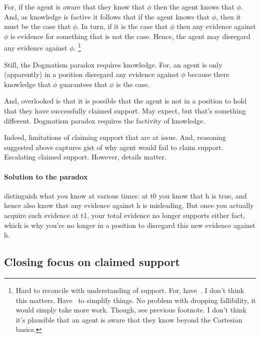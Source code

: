 \begin{note}
  For, if the agent is aware that they know that \(\phi\) then the agent knows that \(\phi\).
  And, as knowledge is factive it follows that if the agent knows that \(\phi\), then it must be the case that \(\phi\).
  In turn, if it is the case that \(\phi\) then any evidence against \(\phi\) is evidence for something that is not the case.
  Hence, the agent may disregard any evidence against \(\phi\).\nolinebreak
  \footnote{
    Hard to reconcile with understanding of support.
    For, have~\nfcs{}.
    I don't think this matters.
    Have~\nfcs{} to simplify things.
    No problem with dropping fallibility, it would simply take more work.
    Though, see previous footnote.
    I don't think it's plausible that an agent is aware that they know beyond the Cartesian basics.
  }

  Still, the Dogmatism paradox requires knowledge.
  For, an agent is only (apparently) in a position disregard any evidence against \(\phi\) because there knowledge that \(\phi\) guarantees that \(\phi\) is the case.

  And, overlooked is that it is possible that the agent is not in a position to hold that they have successfully claimed support.
  May expect, but that's something different.
  Dogmatism paradox requires the factivity of knowledge.

  Indeed, limitations of claiming support that are at issue.
  And, reasoning suggested above captures gist of why agent would fail to claim support.
  Escalating claimed support.
  However, details matter.
\end{note}

\paragraph{Solution to the paradox}

\begin{note}
  distinguish what you know at various times: at t0 you know that h is true, and hence also know that any evidence against h is misleading. But once you actually acquire such evidence at t1, your total evidence no longer supports either fact, which is why you're no longer in a position to disregard this new evidence against h.
\end{note}

\subsection{Closing focus on claimed support}

